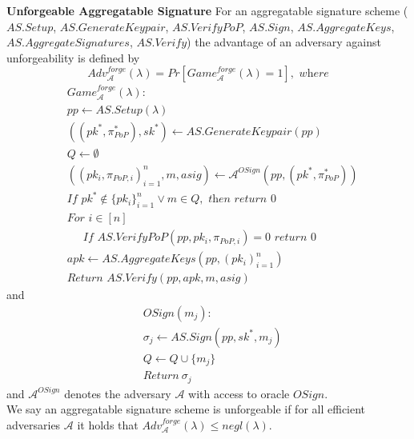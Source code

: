 \noindent \textbf{Unforgeable Aggregatable Signature}
For an aggregatable signature scheme ($\mathit{AS.Setup}$, $\mathit{AS.GenerateKeypair}$, $\mathit{AS.VerifyPoP}$, $\mathit{AS.Sign}$,
$\mathit{AS.AggregateKeys}$, $\mathit{AS.AggregateSignatures}$, $\mathit{AS.Verify}$)
the advantage of an adversary against unforgeability is defined by
$$\mathit{Adv}^{\mathit{forge}}_{\mathcal{A}}({\lambda}) = \mathit{Pr}[\mathit{Game}^{\mathit{forge}}_{\mathcal{A}}({\lambda}) =1], \textit{\ where}$$
\vspace{-0.25in}
\begin{align*}
&\mathit{Game}^{\mathit{forge}}_{\mathcal{A}}({\lambda}): \\
& \mathit{pp} \leftarrow \mathit{AS.Setup(\lambda)} \\
& ((\mathit{pk}^*,\pi^*_{\mathit{PoP}}), \mathit{sk}^*) \leftarrow \mathit{AS.GenerateKeypair}(\mathit{pp})\\
& Q \leftarrow \emptyset \\
& ((\mathit{pk_i}, \pi_{\mathit{PoP},i})_{i=1}^{n}, m, \mathit{asig}) \leftarrow \mathcal{A}^{\mathit{OSign}}(\mathit{pp}, (\mathit{pk^*},\pi^*_{\mathit{PoP}})) \\
& \textit{If } \mathit{pk}^* \notin \{\mathit{pk_i}\}_{i=1}^{n} \vee m \in Q, \textit{ then return } 0 \\
& \textit{For } i \in [n] \\
& \ \ \ \ \ \textit{ If } \mathit{AS.VerifyPoP}(\mathit{pp}, \mathit{pk_i}, \pi_{\mathit{PoP},i})=0  \textit{ return } 0 \\
& \mathit{apk} \leftarrow \mathit{AS.AggregateKeys}(\mathit{pp}, (\mathit{pk_i})_{i=1}^{n}) \\
& \textit{Return } \mathit{AS.Verify}(\mathit{pp}, \mathit{apk}, m, \mathit{asig})
\end{align*}
\noindent and
\begin{align*}
& \mathit{OSign}(m_j): \\
& \sigma_j \leftarrow \mathit{AS.Sign}(\mathit{pp}, \mathit{sk}^*, m_j) \\
&  Q \leftarrow Q \cup \{m_j\} \\
& \textit{Return} \ \sigma_j
\end{align*}
\noindent and $\mathcal{A}^{\mathit{OSign}}$ denotes the adversary $\mathcal{A}$ with access to oracle $\mathit{OSign}$. \\
\noindent We say an aggregatable signature scheme is unforgeable if for all efficient adversaries
$\mathcal{A}$ it holds that $\mathit{Adv}^{\mathit{forge}}_{\mathcal{A}}({\lambda}) \leq \mathit{negl}(\lambda)$. 

